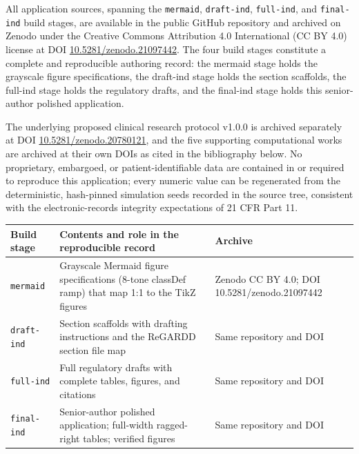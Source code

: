 All application sources, spanning the \texttt{mermaid}, \texttt{draft-ind},
\texttt{full-ind}, and \texttt{final-ind} build stages, are available in the public
GitHub repository and archived on Zenodo under the Creative Commons Attribution 4.0
International (CC BY 4.0) license at DOI
\href{https://doi.org/10.5281/zenodo.21097442}{10.5281/zenodo.21097442}. The four
build stages constitute a complete and reproducible authoring record: the mermaid
stage holds the grayscale figure specifications, the draft-ind stage holds the
section scaffolds, the full-ind stage holds the regulatory drafts, and the final-ind
stage holds this senior-author polished application. 

The underlying proposed clinical
research protocol v1.0.0 is archived separately at DOI
\href{https://doi.org/10.5281/zenodo.20780121}{10.5281/zenodo.20780121}, and the five
supporting computational works are archived at their own DOIs as cited in the
bibliography below. No proprietary, embargoed, or patient-identifiable data are
contained in or required to reproduce this application; every numeric value can be
regenerated from the deterministic, hash-pinned simulation seeds recorded in the
source tree, consistent with the electronic-records integrity expectations of
21 CFR Part 11.

\begin{table}[htbp]
\centering
\begin{tabularx}{\textwidth}{>{\raggedright\arraybackslash}p{2.8cm} Y >{\raggedright\arraybackslash}p{4.2cm}}
\toprule
\textbf{Build stage} & \textbf{Contents and role in the reproducible record} & \textbf{Archive} \\
\midrule
\texttt{mermaid} & Grayscale Mermaid figure specifications (8-tone classDef ramp) that map 1:1 to the TikZ figures & Zenodo CC BY 4.0; DOI 10.5281/zenodo.21097442 \\
\texttt{draft-ind} & Section scaffolds with drafting instructions and the ReGARDD section file map & Same repository and DOI \\
\texttt{full-ind} & Full regulatory drafts with complete tables, figures, and citations & Same repository and DOI \\
\texttt{final-ind} & Senior-author polished application; full-width ragged-right tables; verified figures & Same repository and DOI \\
\bottomrule
\end{tabularx}
\vspace*{-0.4cm}
\end{table}

